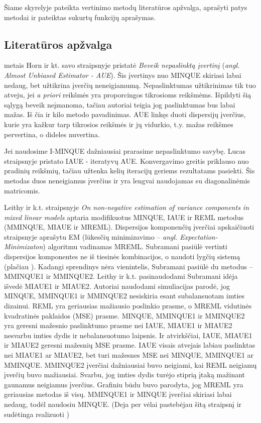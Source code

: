 \documentclass[11pt,a4paper]{article}
\begin{document}
\indent Šiame skyrelyje pateikta vertinimo metodų literatūros apžvalga, aprašyti patys metodai ir pateiktas sukurtų funkcijų aprašymas.

\subsection{Literatūros apžvalga}

 metais Horn ir kt. savo straipsnyje \cite{AUE} pristatė \textit{Beveik nepaslinktą įvertinį} (\textit{angl. Almost Unbiased Estimator - AUE}). Šis įvertinys nuo MINQUE skiriasi labai nedaug, bet užtikrina įverčių neneigiamumą. Nepaslinktumas užtikrinimas tik tuo atveju, jei \textit{a priori} reikšmės yra proporcingos tikrosioms reikšmėms. Išpildyti šią sąlygą beveik neįmanoma, tačiau autoriai teigia jog paslinktumas bus labai mažas. Iš čia ir kilo metodo pavadinimas. AUE linkęs duoti dispersijų įverčius, kurie yra kažkur tarp tikrosios reikšmės ir jų vidurkio, t.y. mažas reikšmes pervertina, o dideles nuvertina.

\indent Jei naudosime I-MINQUE dažniausiai prarasime nepaslinktumo savybę. Lucas straipsnyje \cite{IAUE} pristato IAUE - iteratyvų AUE. Konvergavimo greitis priklauso nuo pradinių reikšmių, tačiau užtenka kelių iteracijų geriems rezultatams pasiekti. Šis metodas duos neneigiamus įverčius ir yra lengvai naudojamas su diagonalinėmis matricomis.

\indent Leithy ir k.t. straipsnyje \textit{On non-negative estimation of variance components in mixed linear models} \cite{MMINQUE} aptaria  modifikuotus MINQUE, IAUE ir REML metodus (MMINQUE, MIAUE ir MREML). Dispersijos komponenčių įverčiai apskaičiuoti straipsnyje aprašytu EM (lūkesčių minimizavimo --  \textit{angl. Expectation-Minimizaton}) algoritmu vadinamas MREML. Subramani \cite{MMIVQUE} pasiūlė vertinti dispersijos komponentes ne iš tiesinės kombinacijos, o naudoti lygčių sistemą (plačiau \cite{MMINQUE}). Kadangi sprendinys nėra vienintelis, Subramani pasiūlė du metodus -- MMINQUE1 ir MMINQUE2. Leithy ir k.t. pasinaudodami Subramani idėja išvedė MIAUE1 ir MIAUE2. Autoriai naudodami simuliacijas parodė, jog MINQUE, MMINQUE1 ir MMINQUE2 nesiskiria esant subalansuotam imties dizainui. REML yra geriausias mažiausio poslinkio prasme, o MREML vidutinės kvadratinės paklaidos (MSE) prasme. MINQUE, MMINQUE1 ir MMINQUE2 yra geresni mažesnio paslinktumo prasme nei IAUE, MIAUE1 ir MIAUE2 nesvarbu imties dydis ir nebalansuotumo laipsnis. Ir atvirkščiai, IAUE, MIAUE1 ir MIAUE2 geresni mažesnių MSE prasme. IAUE visais atvejais labiau paslinktas nei MIAUE1 ar MIAUE2, bet turi mažesnes MSE nei MINQUE, MMINQUE1 ar MMINQUE. MMINQUE2 įverčiai dažniausiai buvo neigiami, kai REML neigiamų įverčių buvo mažiausiai. Svarbu, jog imties dydis turėjo stiprią įtaką mažinant gaunamus neigiamus įverčius. Grafiniu būdu buvo parodyta, jog MREML yra geriausias metodas iš visų. MMINQUE1 ir MINQUE įverčiai skiriasi labai nedaug, todėl naudosiu MINQUE. (Deja per vėlai pastebėjau šitą straipsnį ir sudėtinga realizuoti )
\end{document}
